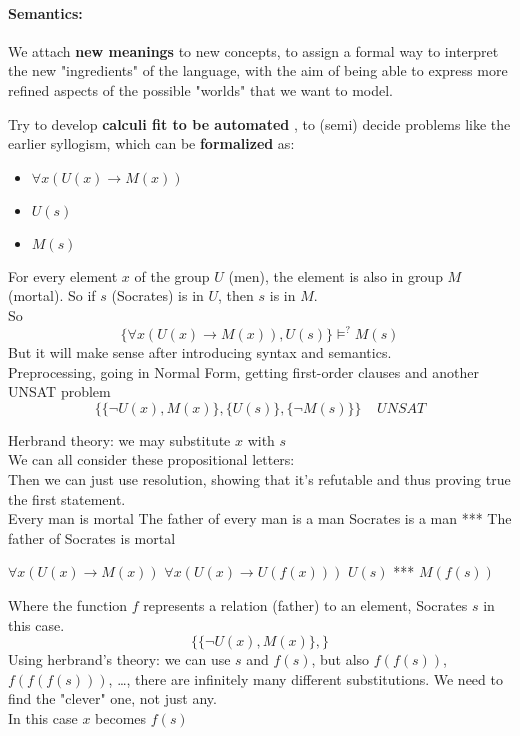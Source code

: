 \paragraph{Semantics:} We attach \textbf{new meanings} to new concepts, to assign a formal way to interpret the new "ingredients" of the language, with the aim of being able to express more refined aspects of the possible "worlds" that we want to model.\\

\newpage

Try to develop \textbf{calculi fit to be automated} , to (semi) decide problems like the earlier syllogism, which can be \textbf{formalized} as:
\begin{itemize}
	\item $\forall x (U(x) \rightarrow M(x))$
	\item $U(s)$
	 \\ \bline
	\item $M(s)$
\end{itemize}
For every element $x$ of the group $U$ (men), the element is also in group $M$ (mortal). So if $s$ (Socrates) is in $U$, then $s$ is in $M$.\\

So 
$$ \{\forall x (U(x) \rightarrow M(x)), U(s)\} \models^? M(s) $$
But it will make sense after introducing syntax and semantics.\\







Preprocessing, going in Normal Form, getting first-order clauses and another UNSAT problem
$$ \{ \{\neg U(x), M(x)\}, \{U(s)\}, \{\neg M(s)\} \} \;\;\;\; UNSAT $$

Herbrand theory: we may substitute $x$ with $s$ 
$$
$$
We can all consider these propositional letters:
$$ 
$$
Then we can just use resolution, showing that it's refutable and thus proving true the first statement.\\

Every man is mortal 
The father of every man is a man
Socrates is a man
***
The father of Socrates is mortal

$\forall x (U(x) \rightarrow M(x))$
$\forall x (U(x) \rightarrow U(f(x)))$
$U(s)$
***
$M(f(s))$

Where the function $f$ represents a relation (father) to an element, Socrates $s$ in this case.\\


$$ 
\{ \{\neg U(x), M(x)\},
\}
$$
Using herbrand's theory: we can use $s$ and $f(s)$, but also $f(f(s))$, $f(f(f(s)))$, \dots, there are infinitely many different substitutions. We need to find the "clever" one, not just any.\\
In this case $x$ becomes $f(s)$
$$
$$

